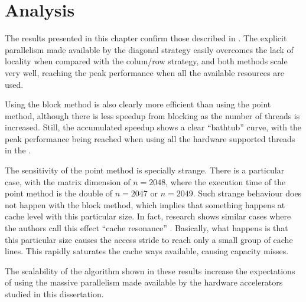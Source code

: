 \documentclass[../thesis]{subfiles}
\begin{document}
	\section{Analysis}
	\label{sec:multicore:analysis}

	The results presented in this chapter confirm those described in \cite{Deadman:Higham:Ralha:2013}. The explicit parallelism made available by the diagonal strategy easily overcomes the lack of locality when compared with the colum/row strategy, and both methods scale very well, reaching the peak performance when all the available resources are used.

	Using the block method is also clearly more efficient than using the point method, although there is less speedup from blocking as the number of threads is increased. Still, the accumulated speedup shows a clear ``bathtub'' curve, with the peak performance being reached when using all the hardware supported threads in the \cpu.

	The sensitivity of the point method is specially strange. There is a particular case, with the matrix dimension of $n = 2048$, where the execution time of the point method is the double of $n = 2047$ or $n = 2049$. Such strange behaviour does not happen with the block method, which implies that something happens at cache level with this particular size. In fact, research shows similar cases where the authors call this effect ``cache resonance'' \cite{MathWorks:LAPACK,SO:cache_resonance}. Basically, what happens is that this particular size causes the access stride to reach only a small group of cache lines. This rapidly saturates the cache ways available, causing capacity misses.

	The scalability of the algorithm shown in these results increase the expectations of using the massive parallelism made available by the hardware accelerators studied in this dissertation.
\end{document}
